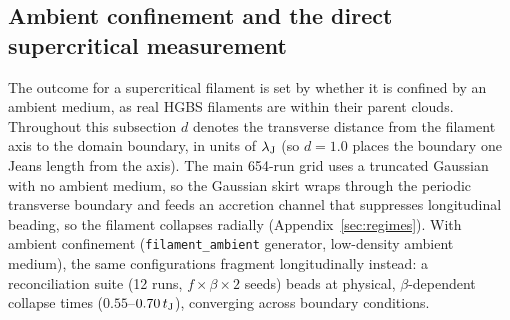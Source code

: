 \documentclass[usenatbib,twoside,twocolumn]{mnras}
\begin{document}
\subsection{Ambient confinement and the direct supercritical measurement}
\label{sec:modecompetition}

The outcome for a supercritical filament is set by whether it is confined by an ambient medium, as real HGBS filaments are within their parent clouds. Throughout this subsection $d$ denotes the transverse distance from the filament axis to the domain boundary, in units of $\lambda_{\rm J}$ (so $d=1.0$ places the boundary one Jeans length from the axis). The main 654-run grid uses a truncated Gaussian with no ambient medium, so the Gaussian skirt wraps through the periodic transverse boundary and feeds an accretion channel that suppresses longitudinal beading, so the filament collapses radially (Appendix~\ref{sec:regimes}). With ambient confinement (\texttt{filament\_ambient} generator, low-density ambient medium), the same configurations fragment longitudinally instead: a reconciliation suite (12 runs, $f\times\beta\times2$ seeds) beads at physical, $\beta$-dependent collapse times ($0.55$--$0.70\,t_{\rm J}$), converging across boundary conditions.
\end{document}
